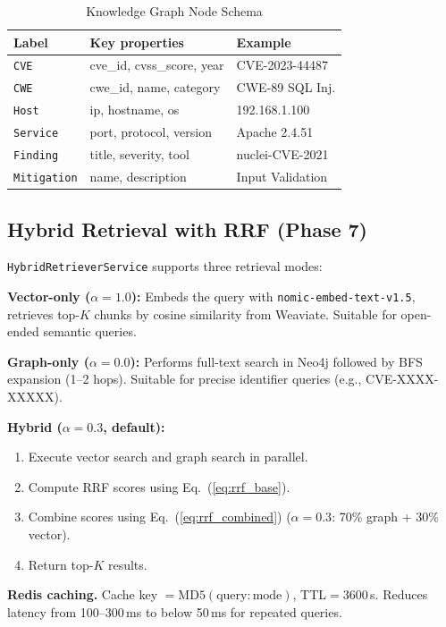 \documentclass[conference]{IEEEtran}
\begin{document}
\begin{table}[htbp]
  \centering
  \caption{Knowledge Graph Node Schema}
  \label{tab:schema}
  \begin{tabular}{lll}
    \toprule
    \textbf{Label} & \textbf{Key properties} & \textbf{Example} \\
    \midrule
    \texttt{CVE}     & cve\_id, cvss\_score, year   & CVE-2023-44487 \\
    \texttt{CWE}     & cwe\_id, name, category      & CWE-89 SQL Inj. \\
    \texttt{Host}    & ip, hostname, os             & 192.168.1.100 \\
    \texttt{Service} & port, protocol, version      & Apache 2.4.51 \\
    \texttt{Finding} & title, severity, tool        & nuclei-CVE-2021 \\
    \texttt{Mitigation}& name, description           & Input Validation \\
    \bottomrule
  \end{tabular}
\end{table}

\subsection{Hybrid Retrieval with RRF (Phase 7)}

\texttt{HybridRetrieverService} supports three retrieval modes:

\textbf{Vector-only ($\alpha = 1.0$):}
Embeds the query with \texttt{nomic-embed-text-v1.5}, retrieves top-$K$
chunks by cosine similarity from Weaviate.
Suitable for open-ended semantic queries.

\textbf{Graph-only ($\alpha = 0.0$):}
Performs full-text search in Neo4j followed by BFS expansion (1--2 hops).
Suitable for precise identifier queries (e.g., CVE-XXXX-XXXXX).

\textbf{Hybrid ($\alpha = 0.3$, default):}
\begin{enumerate}
  \item Execute vector search and graph search in parallel.
  \item Compute RRF scores using Eq.~(\ref{eq:rrf_base}).
  \item Combine scores using Eq.~(\ref{eq:rrf_combined})
        ($\alpha{=}0.3$: 70\% graph + 30\% vector).
  \item Return top-$K$ results.
\end{enumerate}

\textbf{Redis caching.}
Cache key $= \mathrm{MD5}(\text{query}:\text{mode})$, TTL$=3600$\,s.
Reduces latency from 100--300\,ms to below 50\,ms for repeated queries.
\end{document}
